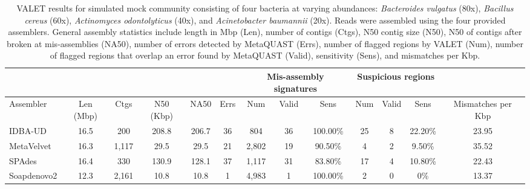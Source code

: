 \documentclass{article}
\begin{document}
\begin{landscape}
\begin{table}
\centering
\footnotesize
\begin{tabular}{|l|c|c|c|c|c|c|c|c|c|c|c|c|}
  \hline
  \multicolumn{6}{|c}{} & \multicolumn{3}{|c|}{Mis-assembly signatures} & \multicolumn{3}{c|}{Suspicious regions}   &  \\
  \hline
  Assembler   & Len (Mbp) & Ctgs  & N50 (Kbp) & NA50  & Errs & Num   & Valid & Sens     & Num & Valid & Sens    & Mismatches per Kbp \\
  \hline
  IDBA-UD     & 16.5      & 200   & 208.8     & 206.7 & 36   & 804   & 36    & 100.00\% & 25  & 8     & 22.20\% & 23.95              \\
  MetaVelvet  & 16.3      & 1,117 & 29.5      & 29.5  & 21   & 2,802 & 19    & 90.50\%  & 4   & 2     & 9.50\%  & 35.52              \\
  SPAdes      & 16.4      & 330   & 130.9     & 128.1 & 37   & 1,117 & 31    & 83.80\%  & 17  & 4     & 10.80\% & 22.43              \\
  Soapdenovo2 & 12.3      & 2,161 & 10.8      & 10.8  & 1    & 4,983 & 1     & 100.00\% & 2   & 0     & 0\%     & 13.37 \\
  \hline
\end{tabular}
\caption[VALET results for simulated mock community]{VALET results for simulated mock community consisting of four bacteria at varying abundances: \emph{Bacteroides vulgatus} (80x), \emph{Bacillus cereus} (60x), \emph{Actinomyces odontolyticus} (40x), and \emph{Acinetobacter baumannii} (20x). Reads were assembled using the four provided assemblers. General assembly statistics include length in Mbp (Len), number of contigs (Ctgs), N50 contig size (N50), N50 of contigs after broken at mis-assemblies (NA50), number of errors detected by MetaQUAST (Errs), number of flagged regions by VALET (Num), number of flagged regions that overlap an error found by MetaQUAST (Valid), sensitivity (Sens), and mismatches per Kbp.}
\label{simulated_community}
\end{table}


\end{landscape}
\end{document}
